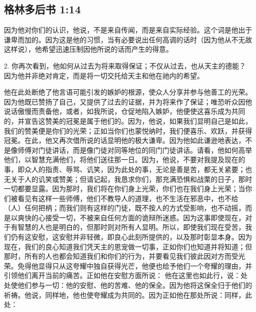 
\subsection{格林多后书 1:14}

\par

因为他对你们的认识，他说，不是来自传闻，而是来自实际经验。这个词是他出于谦卑而加的。因为这是他的习惯，当有必要说出任何高调的话时（因为他从不无故这样说），他希望迅速压制因他所说的话而产生的得意。\par

\par

2. 你再次看到，他如何从过去为将来取得保证；不仅从过去，也从天主的德能？因为他并非绝对肯定，而是将一切交托给天主和他在祂内的希望。\par

\par

他在此处断绝了他言语可能引发的嫉妒的根源，使众人分享并参与他善工的光荣。因为他既已赞扬了自己，又提供了过去的证据，并为将来作了保证；唯恐听众因他说话傲慢而责备他，或者，如我所说，仓促地陷入嫉妒，他便使这喜乐成为共同的，并宣告这赞美的冠冕是属于他们的。因为，他说，如果我们显明自己是如此，我们的赞美便是你们的光荣；正如当你们也蒙悦纳时，我们便喜乐、欢跃，并获得冠冕。在此，他又再次借所说的话显明他的极大谦卑。因为他如此谦逊地表达，不是像师傅对门徒讲话，而是像门徒对同等地位的同门门徒讲话。请看，他如何高举他们，以智慧充满他们，将他们送往那一日。因为，他说，不要对我提及现在的事，即众人的指责、辱骂、讥笑，因为此处的事，无论是善是苦，都无关紧要；也无关于人的讥笑或赞美；但请记起，我恳求你们，那充满恐惧和战栗的日子，那时一切都要显露。因为那时，我们将在你们身上光荣，你们也在我们身上光荣；当你们被看见有这样一些师傅，他们不教导人的道理，也不生活在邪恶中，也不给（人）任何把柄；而我们则有这样的门徒，既不按人的方式受影响，也不动摇，而是以爽快的心接受一切，不被来自任何方面的诡辩所迷惑。因为这事即使现在，对于有智慧的人也是明白的，但那时则对所有人显明。所以，即使我们现在受苦，我们仍有这安慰，这安慰并非轻微，即良心此刻所提供的，以及那时彰显本身。因为现在，我们的良心知道我们凭天主的恩宠做一切事，正如你们也知道并将知道；但那时，所有的人也都会知道我们和你们的行为，并要看见我们彼此因对方而受光荣。免得他显得只从这夸耀中独自获得光芒，他便也给予他们一个夸耀的理由，并引领他们离开当前的痛苦。正如他在安慰方面所说：  他在这里也如此行，说：处处使他们参与一切：他的安慰、他的苦难、他的保全。因为他将这保全归于他们的祈祷。他说，同样地，他也使夸耀成为共同的。因为正如他在那处所说：同样，此处：\par

